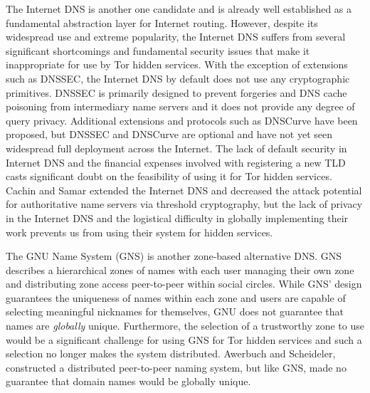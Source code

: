 \documentclass{sig-alternate}
\begin{document}
The Internet DNS is another one candidate and is already well established as a fundamental abstraction layer for Internet routing. However, despite its widespread use and extreme popularity, the Internet DNS suffers from several significant shortcomings and fundamental security issues that make it inappropriate for use by Tor hidden services. With the exception of extensions such as DNSSEC, the Internet DNS by default does not use any cryptographic primitives. DNSSEC is primarily designed to prevent forgeries and DNS cache poisoning from intermediary name servers and it does not provide any degree of query privacy.\cite{wachs2014censorship} Additional extensions and protocols such as DNSCurve\cite{bernstein2009dnscurve} have been proposed, but DNSSEC and DNSCurve are optional and have not yet seen widespread full deployment across the Internet. The lack of default security in Internet DNS and the financial expenses involved with registering a new TLD casts significant doubt on the feasibility of using it for Tor hidden services. Cachin and Samar\cite{cachin2004secure} extended the Internet DNS and decreased the attack potential for authoritative name servers via threshold cryptography, but the lack of privacy in the Internet DNS and the logistical difficulty in globally implementing their work prevents us from using their system for hidden services.

The GNU Name System\cite{wachs2014censorship} (GNS) is another zone-based alternative DNS. GNS describes a hierarchical zones of names with each user managing their own zone and distributing zone access peer-to-peer within social circles. While GNS' design guarantees the uniqueness of names within each zone and users are capable of selecting meaningful nicknames for themselves, GNU does not guarantee that names are \emph{globally} unique. Furthermore, the selection of a trustworthy zone to use would be a significant challenge for using GNS for Tor hidden services and such a selection no longer makes the system distributed. Awerbuch and Scheideler,\cite{awerbuch2004group} constructed a distributed peer-to-peer naming system, but like GNS, made no guarantee that domain names would be globally unique.
\end{document}
